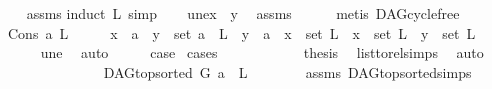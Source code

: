 \begin{isabellebody}
%
\isadelimproof
\ \ %
\endisadelimproof
%
\isatagproof
{}\isamarkupfalse%
\ assms\isanewline
{}\isamarkupfalse%
{\isacharparenleft}{\kern0pt}induct\ L{\isacharcomma}{\kern0pt}\ simp{\isacharparenright}{\kern0pt}\isanewline
\ \ \isamarkupfalse%
\ une{\isacharcolon}{\kern0pt}{\isachardoublequoteopen}x\ {\isasymnoteq}\ y{\isachardoublequoteclose}\ \isamarkupfalse%
\ assms\isanewline
\ \ \ \ \isamarkupfalse%
\ {\isacharparenleft}{\kern0pt}metis\ DAG{\isachardot}{\kern0pt}cycle{\isacharunderscore}{\kern0pt}free{\isacharparenright}{\kern0pt}\ \isanewline
\ \ \isamarkupfalse%
\ {\isacharparenleft}{\kern0pt}Cons\ a\ L{\isacharparenright}{\kern0pt}\isanewline
\ \ \isamarkupfalse%
\ \isamarkupfalse%
\ {\isachardoublequoteopen}x\ {\isacharequal}{\kern0pt}\ a\ {\isasymand}\ y\ {\isasymin}\ set\ {\isacharparenleft}{\kern0pt}a\ {\isacharhash}{\kern0pt}\ L{\isacharparenright}{\kern0pt}{\isachardoublequoteclose}\ {\isacharbar}{\kern0pt}\ {\isachardoublequoteopen}y\ {\isacharequal}{\kern0pt}\ a\ {\isasymand}\ x\ {\isasymin}\ set\ L{\isachardoublequoteclose}\ {\isacharbar}{\kern0pt}\ {\isachardoublequoteopen}x\ {\isasymin}\ set\ L\ {\isasymand}\ y\ {\isasymin}\ set\ L{\isachardoublequoteclose}\isanewline
\ \ \ \ \isamarkupfalse%
\ une\ \isamarkupfalse%
\ auto\isanewline
\ \ \isamarkupfalse%
\ \isamarkupfalse%
\ {\isacharquery}{\kern0pt}case\ \isamarkupfalse%
{\isacharparenleft}{\kern0pt}cases{\isacharparenright}{\kern0pt}\isanewline
\ \ \isamarkupfalse%
\ {}\isanewline
\ \ \ \ \isamarkupfalse%
\ \isamarkupfalse%
\ {\isacharquery}{\kern0pt}thesis\ \isamarkupfalse%
\ list{\isacharunderscore}{\kern0pt}to{\isacharunderscore}{\kern0pt}rel{\isachardot}{\kern0pt}simps\ \isamarkupfalse%
\ auto\isanewline
\ \ \isamarkupfalse%
\isanewline
\ \ \ \ \isamarkupfalse%
\ {}\isanewline
\ \ \ \ \isamarkupfalse%
\ \isamarkupfalse%
\ {\isachardoublequoteopen}{\isasymnot}\ DAG{\isachardot}{\kern0pt}top{\isacharunderscore}{\kern0pt}sorted\ G\ {\isacharparenleft}{\kern0pt}a\ {\isacharhash}{\kern0pt}\ L{\isacharparenright}{\kern0pt}{\isachardoublequoteclose}\isanewline
\ \ \ \ \ \ \isamarkupfalse%
\ assms\ DAG{\isachardot}{\kern0pt}top{\isacharunderscore}{\kern0pt}sorted{\isachardot}{\kern0pt}simps{\isacharparenleft}{\kern0pt}{}{\isacharparenright}{\kern0pt}\isanewline

\end{isabellebody}
